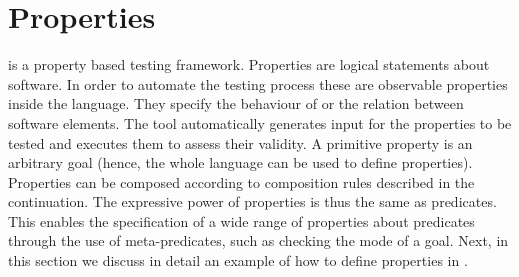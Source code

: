 


\section{Properties}
\label{sec:properties}

\plqc{} is a property based testing framework.
%
Properties are logical statements about software.
%
In order to automate the testing process these are observable properties
inside the language.
%
They specify the behaviour of or the relation between software
elements.
%
The tool automatically generates input for the properties to be tested
and executes them to assess their validity.
%
A primitive property is an arbitrary \Prolog{} goal (hence, the whole
language can be used to define properties).
%
Properties can be composed according to composition
rules described in the continuation.
%
%
%
The expressive power of properties is thus the same as \Prolog{}
predicates.
%
This enables the specification of a wide range of properties about
predicates through the use of meta-predicates, such as checking
the mode of a goal. %
%
Next, in this section we discuss in detail an example of how to define
properties in \plqc{}.


